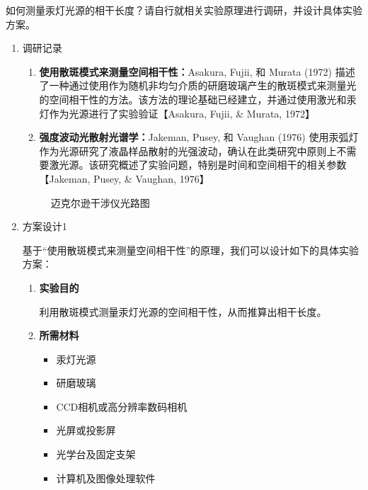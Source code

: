 \documentclass[dvipsnames, svgnames,a4paper,11pt]{article}
\begin{document}
	\begin{question}
		如何测量汞灯光源的相干长度？请自行就相关实验原理进行调研，并设计具体实验方案。
	\end{question}
	\begin{enumerate}
		\item 调研记录
		\begin{enumerate}
			\item \textbf{使用散斑模式来测量空间相干性：}Asakura, Fujii, 和 Murata (1972) 描述了一种通过使用作为随机非均匀介质的研磨玻璃产生的散斑模式来测量光的空间相干性的方法。该方法的理论基础已经建立，并通过使用激光和汞灯作为光源进行了实验验证【Asakura, Fujii, \& Murata, 1972】
			\item \textbf{强度波动光散射光谱学：}Jakeman, Pusey, 和 Vaughan (1976) 使用汞弧灯作为光源研究了液晶样品散射的光强波动，确认在此类研究中原则上不需要激光源。该研究概述了实验问题，特别是时间和空间相干的相关参数【Jakeman, Pusey, \& Vaughan, 1976】
		\end{enumerate}
		
		\begin{figure}[htbp]
			\centering
			\caption{迈克尔逊干涉仪光路图}
			\label{fig:fig4}			
		\end{figure}
		
		\item 方案设计1
		
		基于“使用散斑模式来测量空间相干性”的原理，我们可以设计如下的具体实验方案：
		
		\begin{enumerate}
			\item \textbf{实验目的}
			
			利用散斑模式测量汞灯光源的空间相干性，从而推算出相干长度。
			
			\item \textbf{所需材料}
			
			\begin{itemize}
				\item 汞灯光源
				\item 研磨玻璃
				\item CCD相机或高分辨率数码相机
				\item 光屏或投影屏
				\item 光学台及固定支架
				\item 计算机及图像处理软件
			\end{itemize}
			

\end{enumerate}
\end{enumerate}
\end{document}
